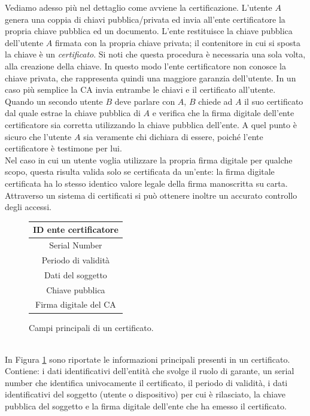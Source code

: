 Vediamo adesso più nel dettaglio come avviene la certificazione. L'utente $A$ genera una coppia di chiavi pubblica/privata ed invia all'ente certificatore la propria chiave pubblica ed un documento. L'ente restituisce la chiave pubblica dell'utente $A$ firmata con la propria chiave privata; il contenitore in cui si sposta la chiave è un \textit{certificato}. Si noti che questa procedura è necessaria una sola volta, alla creazione della chiave. In questo modo l'ente certificatore non conosce la chiave privata, che rappresenta quindi una maggiore garanzia dell'utente. In un caso più semplice la CA invia entrambe le chiavi e il certificato all'utente.\\
Quando un secondo utente $B$ deve parlare con $A$, $B$ chiede ad $A$ il suo certificato dal quale estrae la chiave pubblica di $A$ e verifica che la firma digitale dell'ente certificatore sia corretta utilizzando la chiave pubblica dell'ente. A quel punto è sicuro che l'utente $A$ sia veramente chi dichiara di essere, poiché l'ente certificatore è testimone per lui.\\
Nel caso in cui un utente voglia utilizzare la propria firma digitale per qualche scopo, questa risulta valida solo se certificata da un'ente: la firma digitale certificata ha lo stesso identico valore legale della firma manoscritta su carta. Attraverso un sistema di certificati si può ottenere inoltre un accurato controllo degli accessi.
\begin{figure}[htbp]
	\centering
	\begin{tabular}{|c|}
		\hline
		ID ente certificatore \\
		\hline
		Serial Number \\
		\hline
		Periodo di validità \\
		\hline
		Dati del soggetto \\
		\hline
		Chiave pubblica \\
		\hline
		Firma digitale del CA \\ \hline
	\end{tabular}
	\caption{Campi principali di un certificato.}
	\label{tab:certificate}
\end{figure}\\
In Figura \ref{tab:certificate} sono riportate le informazioni principali presenti in un certificato. Contiene: i dati identificativi dell'entità che svolge il ruolo di garante, un serial number che identifica univocamente il certificato, il periodo di validità, i dati identificativi del soggetto (utente o dispositivo) per cui è rilasciato, la chiave pubblica del soggetto e la firma digitale dell'ente che ha emesso il certificato.

